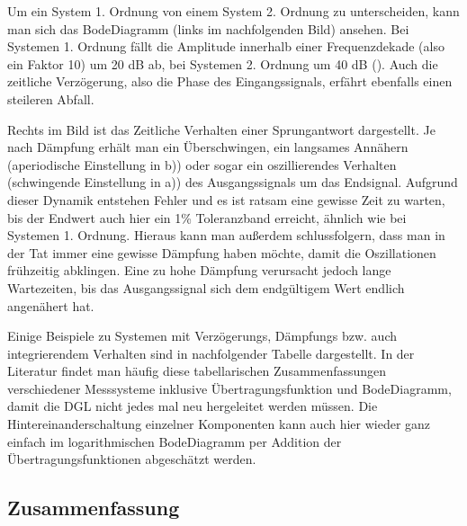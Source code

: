 \documentclass[letterpaper,10pt,english]{jupyterBook}
\begin{document}
\sphinxAtStartPar
Um ein System 1. Ordnung von einem System 2. Ordnung zu unterscheiden, kann man sich das Bode\sphinxhyphen{}Diagramm (links im nachfolgenden Bild) ansehen. Bei Systemen 1. Ordnung fällt die Amplitude innerhalb einer Frequenzdekade (also ein Faktor 10) um \sphinxhyphen{}20 dB ab, bei Systemen 2. Ordnung  um \sphinxhyphen{}40 dB (). Auch die zeitliche Verzögerung, also die Phase des Eingangssignals, erfährt ebenfalls einen steileren Abfall.

\sphinxAtStartPar
Rechts im Bild ist das Zeitliche Verhalten einer Sprungantwort dargestellt. Je nach Dämpfung erhält man ein Überschwingen, ein langsames Annähern (aperiodische Einstellung in b)) oder sogar ein oszillierendes Verhalten (schwingende Einstellung in a)) des Ausgangssignals um das Endsignal. Aufgrund dieser Dynamik entstehen Fehler und es ist ratsam eine gewisse Zeit zu warten, bis der Endwert auch hier ein 1\% Toleranzband erreicht, ähnlich wie bei Systemen 1. Ordnung. Hieraus kann man außerdem schlussfolgern, dass man in der Tat immer eine gewisse Dämpfung haben möchte, damit die Oszillationen frühzeitig abklingen. Eine zu hohe Dämpfung verursacht jedoch lange Wartezeiten, bis das Ausgangssignal sich dem endgültigem Wert endlich angenähert hat.

\sphinxAtStartPar
{}

\sphinxAtStartPar
Einige Beispiele zu Systemen mit Verzögerungs, Dämpfungs bzw. auch integrierendem Verhalten sind in nachfolgender Tabelle dargestellt. In der Literatur findet man häufig diese tabellarischen Zusammenfassungen verschiedener Messsysteme inklusive Übertragungsfunktion und Bode\sphinxhyphen{}Diagramm, damit die DGL nicht jedes mal neu hergeleitet werden müssen. Die Hintereinanderschaltung einzelner Komponenten kann auch hier wieder ganz einfach im logarithmischen Bode\sphinxhyphen{}Diagramm per Addition der Übertragungsfunktionen abgeschätzt werden.

\sphinxAtStartPar
{}


\subsection{Zusammenfassung}
\label{\detokenize{content/5_Uebertragungsfunktion:zusammenfassung}}
\sphinxAtStartPar
\end{document}
